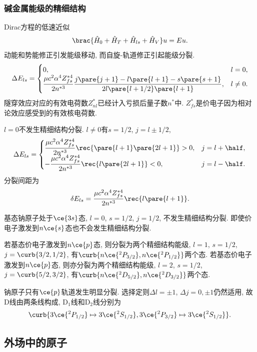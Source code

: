 \documentclass[hidelinks]{ctexart}
\begin{document}


\subsubsection{碱金属能级的精细结构} %
\label{ssub:碱金属能级的精细结构}

Dirac方程的低速近似
\[ \brac{\hat H_0 + \hat H_T + \hat H_{ls} + \hat H_V}u = Eu. \]
动能和势能修正引发能级移动, 而自旋-轨道修正引起能级分裂.
\[ \Delta E_{ls} = \begin{cases}
    0, & l=0, \\
    \displaystyle \frac{\mu c^2\alpha^4 Z_{fs}^{*4}}{2n^{*3}} \frac{j\pare{j+1} - l\pare{l+1} - s\pare{s+1}}{2l\pare{l+1/2}\pare{l+1}}, & l\neq 0.
\end{cases} \]
隧穿效应对应的有效电荷数$Z_{nl}^*$已经计入亏损后量子数$n^*$中. $Z_{fs}^*$是价电子因为相对论效应感受到的有效核电荷数.
\par
$l=0$不发生精细结构分裂. $l\neq 0$有$s=1/2$, $j=l\pm 1/2$,
\[ \Delta E_{ls} = \begin{cases}
    \displaystyle \frac{\mu c^2\alpha^4 Z_{fs}^{*4}}{2n^{*3}} \rec{\pare{l+1}\pare{2l+1}} > 0, & j=l+\half, \\
    \displaystyle -\frac{\mu c^2\alpha^4 Z_{fs}^{*4}}{2n^{*3}} \rec{l\pare{2l+1}} < 0, & j=l-\half.
\end{cases} \]
分裂间距为
\[ \delta E_{ls} = \frac{\mu c^2\alpha^4 Z_{fs}^{*4}}{2n^{*3}} \rec{l\pare{l+1}}. \]
\par
基态钠原子处于$\ce{3s}$态, $l=0$, $s=1/2$, $j=1/2$, 不发生精细结构分裂. 即使价电子激发到$n\ce{s}$态也不会发生精细结构分裂.
\par
若基态价电子激发到$n\ce{p}$态, 则分裂为两个精细结构能级, $l=1$, $s=1/2$, $j=\curb{3/2,1/2}$, 有$\curb{n\ce{^2P_{3/2}},n\ce{^2P_{1/2}}}$两个态. 若基态价电子激发到$n\ce{p}$态, 则亦分裂为两个精细结构能级, $l=2$, $s=1/2$, $j=\curb{5/2,3/2}$, 有$\curb{n\ce{^2D_{5/2}},n\ce{^2D_{3/2}}}$两个态.
\par
钠原子只有$\ce{p}$轨道发生明显分裂. 选择定则$\Delta l = \pm 1$, $\Delta j = 0,\pm 1$仍然适用, 故D线由两条线构成, $\mathrm{D}_1$线和$\mathrm{D}_2$线分别为
\[ \curb{3\ce{^2P_{1/2}}\mapsto 3\ce{^2S_{1/2}}, 3\ce{^2P_{3/2}}\mapsto 3\ce{^2S_{1/2}}}. \]



\subsection{外场中的原子} %
\label{sub:外场中的原子}
\end{document}
